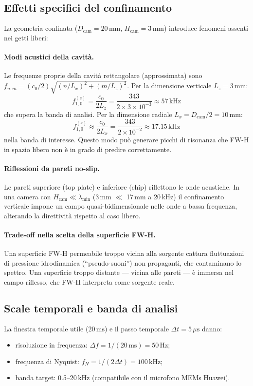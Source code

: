 \documentclass[11pt,a4paper]{article}
\newcommand{\Dcam}{D_{\mathrm{cam}}}
\newcommand{\Hcam}{H_{\mathrm{cam}}}
\newcommand{\mus}{\ensuremath{\,\mu\mathrm{s}}}
\providecommand{\ms}{}\renewcommand{\ms}{\ensuremath{\,\mathrm{ms}}}
\begin{document}
\subsection{Effetti specifici del confinamento}

La geometria confinata
($\Dcam = 20$\,mm, $\Hcam = 3$\,mm) introduce fenomeni assenti nei getti liberi:

\paragraph{Modi acustici della cavità.}
Le frequenze proprie della cavità rettangolare (approssimata) sono
$f_{n,m} = (c_0 / 2)\sqrt{(n/L_x)^2 + (m/L_z)^2}$.
Per la dimensione verticale $L_z = 3$\,mm:
\[
  f_{1,0}^{(z)} = \frac{c_0}{2 L_z} = \frac{343}{2 \times 3 \times 10^{-3}} \approx 57\,\mathrm{kHz}
\]
che supera la banda di analisi. Per la dimensione radiale $L_x = D_\mathrm{cam}/2 = 10$\,mm:
\[
  f_{1,0}^{(r)} \approx \frac{c_0}{2 L_x} = \frac{343}{2 \times 10^{-2}} \approx 17.15\,\mathrm{kHz}
\]
nella banda di interesse. Questo modo può generare picchi di risonanza
che FW-H in spazio libero non è in grado di predire correttamente.

\paragraph{Riflessioni da pareti no-slip.}
Le pareti superiore (top plate) e inferiore (chip) riflettono le onde acustiche.
In una camera con $\Hcam \ll \lambda_{\min}$ (3\,mm $\ll$ 17\,mm a 20\,kHz) il
confinamento verticale impone un campo quasi-bidimensionale nelle onde a bassa
frequenza, alterando la direttività rispetto al caso libero.

\paragraph{Trade-off nella scelta della superficie FW-H.}
Una superficie FW-H permeabile troppo vicina alla sorgente cattura fluttuazioni
di pressione idrodinamica (``pseudo-suoni'') non propaganti, che contaminano
lo spettro. Una superficie troppo distante — vicina alle pareti — è immersa nel
campo riflesso, che FW-H interpreta come sorgente reale.

\subsection{Scale temporali e banda di analisi}

La finestra temporale utile (20\ms) e il passo temporale $\Delta t = 5\mus$ danno:
\begin{itemize}
  \item risoluzione in frequenza: $\Delta f = 1/(20\,\mathrm{ms}) = 50$\,Hz;
  \item frequenza di Nyquist: $f_N = 1/(2\Delta t) = 100$\,kHz;
  \item banda target: 0.5–20\,kHz (compatibile con il microfono MEMs Huawei).
\end{itemize}
\end{document}
